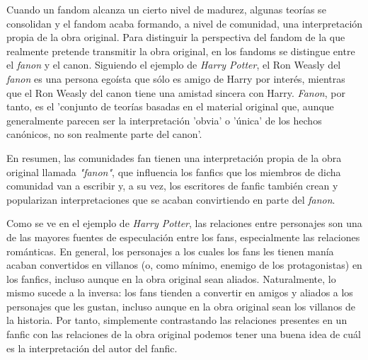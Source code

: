 \documentclass{pre-tfg}
\begin{document}
Cuando un fandom alcanza un cierto nivel de madurez, algunas teorías se consolidan y el fandom acaba formando, a nivel de comunidad, una interpretación propia de la obra original. Para distinguir la perspectiva del fandom de la que realmente pretende transmitir la obra original, en los fandoms se distingue entre el \textit{fanon} y el canon. Siguiendo el ejemplo de \textit{Harry Potter}, el Ron Weasly del \textit{fanon} es una persona egoísta que sólo es amigo de Harry por interés, mientras que el Ron Weasly del canon tiene una amistad sincera con Harry. \textit{Fanon}, por tanto, es el 'conjunto de teorías basadas en el material original que, aunque generalmente parecen ser la interpretación 'obvia' o 'única' de los hechos canónicos, no son realmente parte del canon'\cite{uncanny_2017}.



En resumen, las comunidades fan tienen una interpretación propia de la obra original llamada \textit{"fanon"}, que influencia los fanfics que los miembros de dicha comunidad van a escribir y, a su vez, los escritores de fanfic también crean y popularizan interpretaciones que se acaban convirtiendo en parte del \textit{fanon}.

Como se ve en el ejemplo de \textit{Harry Potter}, las relaciones entre personajes son una de las mayores fuentes de especulación entre los fans, especialmente las relaciones románticas. En general, los personajes a los cuales los fans les tienen manía acaban convertidos en villanos (o, como mínimo, enemigo de los protagonistas) en los fanfics, incluso aunque en la obra original sean aliados. Naturalmente, lo mismo sucede a la inversa: los fans tienden a convertir en amigos y aliados a los personajes que les gustan, incluso aunque en la obra original sean los villanos de la historia. Por tanto, simplemente contrastando las relaciones presentes en un fanfic con las relaciones de la obra original podemos tener una buena idea de cuál es la interpretación del autor del fanfic.
\end{document}

